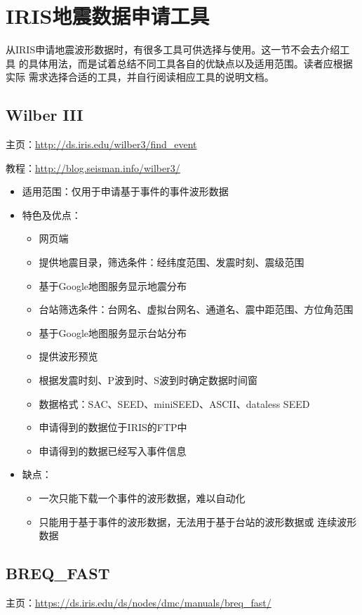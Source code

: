 \section{IRIS地震数据申请工具}
从IRIS申请地震波形数据时，有很多工具可供选择与使用。这一节不会去介绍工具
的具体用法，而是试着总结不同工具各自的优缺点以及适用范围。读者应根据实际
需求选择合适的工具，并自行阅读相应工具的说明文档。

\subsection{Wilber III}
主页：\url{http://ds.iris.edu/wilber3/find_event}

教程：\url{http://blog.seisman.info/wilber3/}

\begin{itemize}
\item 适用范围：仅用于申请基于事件的事件波形数据
\item 特色及优点：
    \begin{itemize}
    \item 网页端
    \item 提供地震目录，筛选条件：经纬度范围、发震时刻、震级范围
    \item 基于Google地图服务显示地震分布
    \item 台站筛选条件：台网名、虚拟台网名、通道名、震中距范围、方位角范围
    \item 基于Google地图服务显示台站分布
    \item 提供波形预览
    \item 根据发震时刻、P波到时、S波到时确定数据时间窗
    \item 数据格式：SAC、SEED、miniSEED、ASCII、dataless SEED
    \item 申请得到的数据位于IRIS的FTP中
    \item 申请得到的数据已经写入事件信息
    \end{itemize}
\item 缺点：
    \begin{itemize}
    \item 一次只能下载一个事件的波形数据，难以自动化
    \item 只能用于基于事件的波形数据，无法用于基于台站的波形数据或
        连续波形数据
    \end{itemize}
\end{itemize}

\subsection{BREQ\_FAST}
主页：\url{https://ds.iris.edu/ds/nodes/dmc/manuals/breq_fast/}

